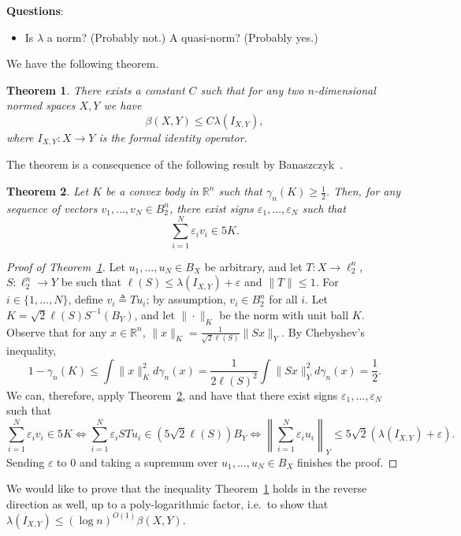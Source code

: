 \documentclass[12pt]{article}
\newtheorem{theorem}{Theorem}
\newcommand{\R}{{\mathbb{R}}}
\newcommand\eps{\varepsilon}
\newcommand{\eqdef}{\triangleq}
\begin{document}
\medskip\noindent
\textbf{Questions}:
\begin{itemize}
\item Is $\lambda$ a norm? (Probably not.) A quasi-norm? (Probably yes.)
\end{itemize}


We have the following theorem.

\begin{theorem}\label{thm:factorization}
  There exists a constant $C$ such that for any two $n$-dimensional
  normed spaces $X, Y$ we have
  \[
  \beta(X,Y) \le C\lambda(I_{X,Y}),
  \]
  where $I_{X,Y}:X \to Y$ is the formal identity operator. 
\end{theorem}

The theorem is a consequence of the following result by Banaszczyk~\cite{bana}.
\begin{theorem}\label{thm:bana}
  Let $K$ be a convex body in $\R^n$ such that $\gamma_n(K) \ge
  \frac12$. Then, for any sequence of vectors $v_1, \ldots, v_N \in
  B_2^n$, there exist signs $\eps_1, \ldots, \eps_N$ such that
  \[
  \sum_{i = 1}^N{\eps_i v_i}\in 5K.
  \]
\end{theorem}

\begin{proof}[Proof of Theorem~\ref{thm:factorization}]
  Let $u_1, \ldots, u_N \in B_X$ be arbitrary, and let $T:X \to
  \ell_2^n$, $S:\ell_2^n \to Y$ be such that $\ell(S)\le
  \lambda(I_{X,Y}) + \eps$ and $\|T\| \le 1$. For $i \in \{1, \ldots,
  N\}$, define $v_i \eqdef Tu_i$; by assumption, $v_i \in B_2^n$ for
  all $i$. Let $K = \sqrt{2}\ell(S) S^{-1}(B_Y)$, and let
  $\|\cdot\|_K$ be the norm with unit ball $K$. Observe that for any
  $x \in \R^n$, $\|x\|_K = \frac{1}{\sqrt{2}\ell(S)}\|Sx\|_Y$. By
  Chebyshev's inequality,
  \[
  1 - \gamma_n(K) \le \int \|x\|_K^2 d\gamma_n(x)
  =
  \frac{1}{2\ell(S)^2} \int \|Sx\|_Y^2 d\gamma_n(x)
  = \frac{1}{2}.
  \]
  We can, therefore, apply Theorem~\ref{thm:bana}, and have that there
  exist signs $\eps_1, \ldots, \eps_N$ such that 
  \[
  \sum_{i =1}^N{\eps_i v_i} \in 5K
  \iff
  \sum_{i = 1}^N{\eps_i ST u_i} \in (5\sqrt{2}\ell(S))B_Y
  \iff 
  \left\|\sum_{i = 1}^N{\eps_i u_i}\right\|_Y \le 5\sqrt{2}(\lambda(I_{X,Y})
    + \eps).
  \]
  Sending $\eps$ to $0$ and taking a supremum over
  $u_1, \ldots, u_N \in B_X$  finishes the proof.
\end{proof}

We would like to prove that the inequality
Theorem~\ref{thm:factorization} holds in the reverse direction as
well, up to a poly-logarithmic factor, i.e.~to show that
$\lambda(I_{X,Y}) \le (\log n)^{O(1)}\beta(X,Y)$.
\end{document}
